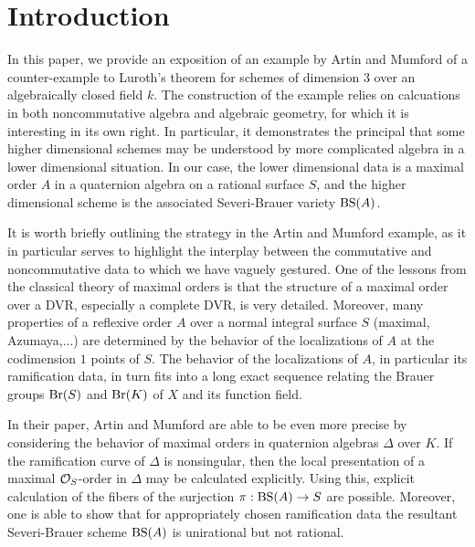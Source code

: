 \section{Introduction}
In this paper, we provide an exposition of an example by Artin and Mumford \cite{artin1972some} of a counter-example to Luroth's theorem for schemes of dimension $3$ over an algebraically closed field $k$.  The construction of the example relies on calcuations in both noncommutative algebra and algebraic geometry, for which it is interesting in its own right.  In particular, it demonstrates the principal that some higher dimensional schemes may be understood by more complicated algebra in a lower dimensional situation.  In our case, the lower dimensional data is a maximal order $A$ in a quaternion algebra on a rational surface $S$, and the higher dimensional scheme is the associated Severi-Brauer variety $\textnormal{BS}(A)$.

It is worth briefly outlining the strategy in the Artin and Mumford example, as it in particular serves to highlight the interplay between the commutative and noncommutative data to which we have vaguely gestured.  One of the lessons from the classical theory of maximal orders is that the structure of a maximal order over a DVR, especially a complete DVR, is very detailed.  Moreover, many properties of a reflexive order $A$ over a normal integral surface $S$ (maximal, Azumaya,...) are determined by the behavior of the localizations of $A$ at the codimension $1$ points of $S$.  The behavior of the localizations of $A$, in particular its ramification data, in turn fits into a long exact sequence relating the Brauer groups $\textnormal{Br}(S)$ and $\textnormal{Br}(K)$ of $X$ and its function field.

In their paper, Artin and Mumford are able to be even more precise by considering the behavior of maximal orders in quaternion algebras $\Delta$ over $K$.  If the ramification curve of $\Delta$ is nonsingular, then the local presentation of a maximal $\mathcal{O}_S$-order in $\Delta$ may be calculated explicitly.  Using this, explicit calculation of the fibers of the surjection $\pi: \textnormal{BS}(A)\rightarrow S$ are possible.  Moreover, one is able to show that for appropriately chosen ramification data the resultant Severi-Brauer scheme $\textnormal{BS}(A)$ is unirational but not rational.

